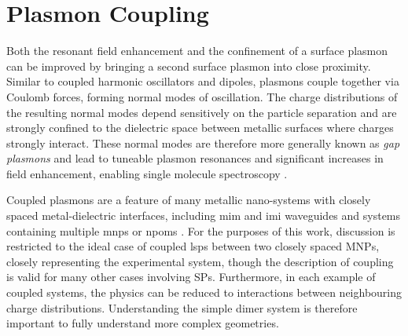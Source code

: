 \documentclass{article}
\begin{document}
\section{Plasmon Coupling}

Both the resonant field enhancement and the confinement of a surface plasmon can be improved by bringing a second surface plasmon into close proximity. Similar to coupled harmonic oscillators and dipoles, plasmons couple together via Coulomb forces, forming normal modes of oscillation. The charge distributions of the resulting normal modes depend sensitively on the particle separation and are strongly confined to the dielectric space between metallic surfaces where charges strongly interact. These normal modes are therefore more generally known as \emph{gap plasmons} and lead to tuneable plasmon resonances \cite{huang2010, millyard2012} and significant increases in field enhancement, enabling single molecule spectroscopy \cite{mertens2013, taylor2014}.

Coupled plasmons are a feature of many metallic nano-systems with closely spaced metal-dielectric interfaces, including \gls{mim} and \gls{imi} waveguides \cite{maier2007plasmonics, lindquist2013} and systems containing multiple \glspl{mnp} \cite{maier2002, atay2004, muskens2007, huang2010, millyard2012, taylor2011, herrmann2013} or \glspl{npom} \cite{okamoto2003, daniels2005, kinnan2007, mubeen2012, mertens2013, denijs2014}. For the purposes of this work, discussion is restricted to the ideal case of coupled \glspl{lsp} between two closely spaced MNPs, closely representing the experimental system, though the description of coupling is valid for many other cases involving SPs. Furthermore, in each example of coupled systems, the physics can be reduced to interactions between neighbouring charge distributions. Understanding the simple dimer system is therefore important to fully understand more complex geometries.
\end{document}
